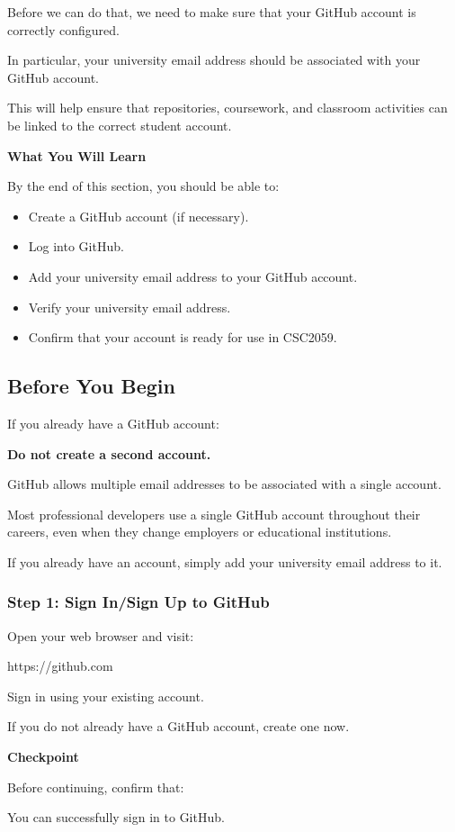 \documentclass{csc2059practical}
\begin{document}
Before we can do that, we need to make sure that your GitHub account is correctly configured.

In particular, your university email address should be associated with your GitHub account.

This will help ensure that repositories, coursework, and classroom activities can be linked to the correct student account.

\begin{learningoutcomes}
\textbf{What You Will Learn}\par
\medskip
By the end of this section, you should be able to:

\begin{itemize}
  \item Create a GitHub account (if necessary).
  \item Log into GitHub.
  \item Add your university email address to your GitHub account.
  \item Verify your university email address.
  \item Confirm that your account is ready for use in CSC2059.
\end{itemize}
\end{learningoutcomes}
\subsection{Before You Begin}
If you already have a GitHub account:

\textbf{Do not create a second account.}

GitHub allows multiple email addresses to be associated with a single account.

Most professional developers use a single GitHub account throughout their careers, even when they change employers or educational institutions.

If you already have an account, simply add your university email address to it.

\subsubsection{Step 1: Sign In/Sign Up to GitHub}
Open your web browser and visit:

https://github.com

Sign in using your existing account.

If you do not already have a GitHub account, create one now.

\begin{reflectionbox}
\textbf{Checkpoint}\par
\medskip

Before continuing, confirm that:


You can successfully sign in to GitHub.


\end{reflectionbox}
\end{document}
